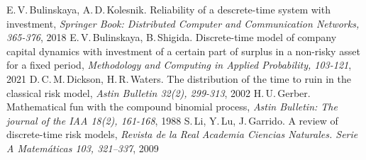 \documentclass[10pt]{beamer}
\theoremstyle{definition}
\theoremstyle{remark}
\begin{document}
\begin{thebibliography}{5}
	 E.\,V.\,Bulinskaya, A.\,D.\,Kolesnik. Reliability of a descrete-time system with investment, \textit{Springer Book: Distributed Computer and Communication Networks, 365-376}, 2018
	 E.\,V.\,Bulinskaya, B.\,Shigida. Discrete-time model of company capital dynamics with investment of a certain part of surplus in a non-risky asset for a fixed period, \textit{Methodology and Computing in Applied Probability, 103-121}, 2021
	 D.\,C.\,M.\,Dickson, H.\,R.\,Waters. The distribution of the time to ruin in the classical risk model, \textit{Astin Bulletin 32(2), 299-313}, 2002
	 H.\,U.\,Gerber. Mathematical fun with the compound binomial process,  \textit{Astin Bulletin: The journal of the IAA 18(2), 161-168}, 1988
	 S.\,Li, Y.\,Lu, J.\,Garrido. A review of discrete-time risk models,  \textit{Revista de la Real Academia Ciencias Naturales. Serie A Matem\'aticas 103, 321–337}, 2009
	\end{thebibliography}

\begin{frame}
\end{frame}
\end{document}
